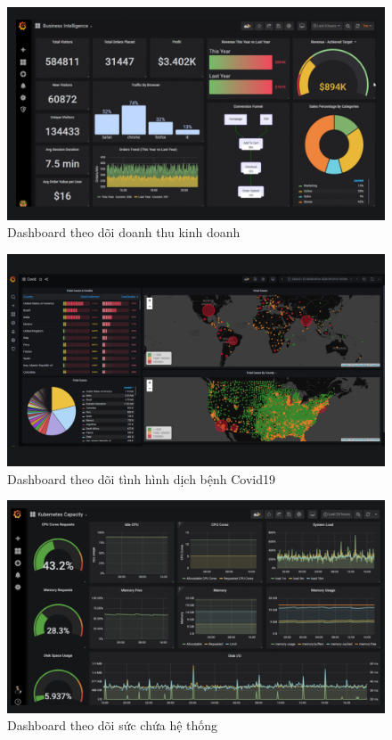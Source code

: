 \begin{figure}[H] %
    \centering %
    \includegraphics[width=1\textwidth]{figures/Grafana8_Revenue.jpg} 
    \caption{Dashboard theo dõi doanh thu kinh doanh} %
    \label{fig:fig_01}
\end{figure}

\begin{figure}[H] %
    \centering %
    \includegraphics[width=1\textwidth]{figures/Grafana8_Covid19.jpg} 
    \caption{Dashboard theo dõi tình hình dịch bệnh Covid19} %
    \label{fig:fig_01}
\end{figure}

\begin{figure}[H] %
    \centering %
    \includegraphics[width=1\textwidth]{figures/Grafana8_Kubernetes.jpg} 
    \caption{Dashboard theo dõi sức chứa hệ thống} %
    \label{fig:fig_01}
\end{figure}
